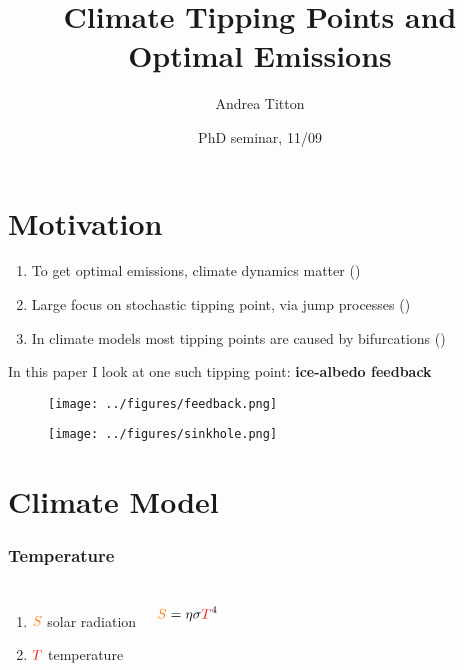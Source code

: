 \documentclass[pdf]{beamer}
\author{Andrea Titton}
\title[Climate Tipping Points and Optimal Emissions]{\small Climate Tipping Points and\\ Optimal Emissions}
\institute{CeNDEF, University of Amsterdam}
\date{PhD seminar, 11/09}
\begin{document}
\frame[plain]{\titlepage}

\section{Motivation}
\begin{frame}
    \begin{enumerate}
        \item To get optimal emissions, climate dynamics matter (\cite{dietz_are_2020, dietz_economic_2021})
        \pause \item Large focus on stochastic tipping point, via jump processes (\cite{van_den_bremer_risk-adjusted_2021,lin_social_2023})
        \pause \item In climate models most tipping points are caused by bifurcations (\cite{ashwin_tipping_2012,ashwin_extreme_2020})
    \end{enumerate}
\end{frame}

\begin{frame}
    In this paper I look at one such tipping point: \textbf{ice-albedo feedback}

    \pause \begin{figure}
        \centering
        \texttt{[image: ../figures/feedback.png]}
    \end{figure}
\end{frame}


\begin{frame}
    \centering
    \begin{figure}
        \texttt{[image: ../figures/sinkhole.png]}
    \end{figure}
\end{frame}


\section{Climate Model}

\begin{frame} \frametitle{Temperature}
    \begin{columns}
        \begin{enumerate}
            \item ${\color{orange} S}$ solar radiation
            \item ${\color{red} T}$ temperature
        \end{enumerate}
        \begin{equation*}
            {\color{orange} S} = \eta \sigma {\color{red} T}^4
        \end{equation*}
    \end{columns}
\end{frame}
\end{document}
